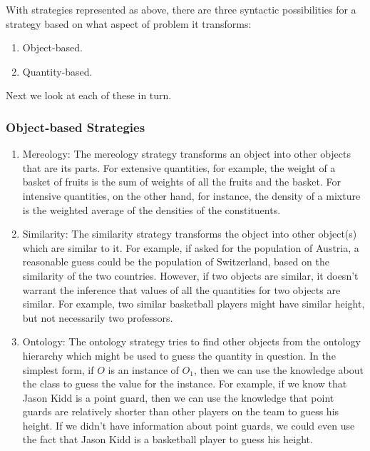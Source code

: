 With strategies represented as above, there are three syntactic possibilities for a strategy based on what aspect of problem it transforms:
%
\begin{enumerate}
\item Object-based.
\item Quantity-based.
\end{enumerate}

Next we look at each of these in turn.


\subsubsection{Object-based Strategies}
%
\begin{enumerate}
\item Mereology: The mereology strategy transforms an object into other objects that are its parts. For extensive quantities, for example, the weight of a basket of fruits is the sum of weights of all the fruits and the basket. For intensive quantities, on the other hand, for instance, the density of a mixture is the weighted average of the densities of the constituents.
%
\item Similarity: The similarity strategy transforms the object into other object(s) which are similar to it. For example, if asked for the population of Austria, a reasonable guess could be the population of Switzerland, based on the similarity of the two countries. However, if two objects are similar, it doesn't warrant the inference that values of all the quantities for two objects are similar. For example, two similar basketball players might have similar height, but not necessarily two professors.
%
\item Ontology: The ontology strategy tries to find other objects from the ontology hierarchy which might be used to guess the quantity in question. In the simplest form, if $O$ is an instance of $O_1$, then we can use the knowledge about the class to guess the value for the instance. For example, if we know that Jason Kidd is a point guard, then we can use the knowledge that point guards are relatively shorter than other players on the team to guess his height. If we didn't have information about point guards, we could even use the fact that Jason Kidd is a basketball player to guess his height.
\end{enumerate}



